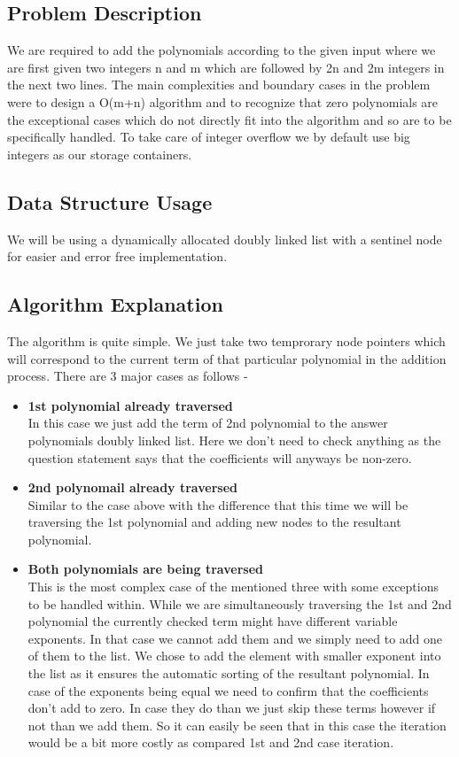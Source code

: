 \documentclass[20pt]{article}
\begin{document}
\subsection{Problem Description}
We are required to add the polynomials according to the given input where we are first given two integers n and m which are followed by {2n} and {2m} integers in the next two lines.
The main complexities and boundary cases in the problem were to design a {O(m+n)} algorithm and to recognize that zero polynomials are the exceptional cases which do not directly fit into the algorithm and so are to be specifically handled. To take care of integer overflow we by default use big integers as our storage containers.

\subsection{Data Structure Usage}
We will be using a dynamically allocated doubly linked list with a sentinel node for easier and error free implementation.

\subsection{Algorithm Explanation}
The algorithm is quite simple. We just take two temprorary node pointers which will correspond to the current term of that particular polynomial in the addition process. There are 3 major cases as follows -

\begin{itemize}
\item \textbf{1st polynomial already traversed}
\\
In this case we just add the term of 2nd polynomial to the answer polynomials doubly linked list. Here we don't need to check anything as the question statement says that the coefficients will anyways be non-zero.

\item \textbf{2nd polynomail already traversed}
\\
Similar to the case above with the difference that this time we will be traversing the 1st polynomial and adding new nodes to the resultant polynomial.

\item \textbf{Both polynomials are being traversed}
\\
This is the most complex case of the mentioned three with some exceptions to be handled within. While we are simultaneously traversing the 1st and 2nd polynomial the currently checked term might have different variable exponents. In that case we cannot add them and we simply need to add one of them to the list. We chose to add the element with smaller exponent into the list as it ensures the automatic sorting of the resultant polynomial.
In case of the exponents being equal we need to confirm that the coefficients don't add to zero. In case they do than we just skip these terms however if not than we add them.
So it can easily be seen that in this case the iteration would be a bit more costly as compared 1st and 2nd case iteration.
\end{itemize}
\end{document}
